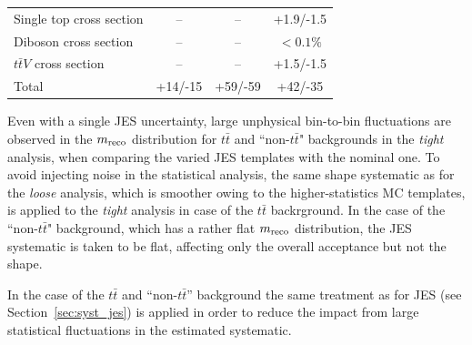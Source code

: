 \begin{table}[htb]
\begin{tabular}{l*{3}{c}}
Single top cross section & -- & -- & +1.9/-1.5\\  
Diboson cross section & -- & -- & $<0.1\%$\\  
$t\bar{t}V$ cross section & -- & -- & +1.5/-1.5\\  
\hline
Total & +14/-15 & +59/-59 & +42/-35\\
\hline\hline
\end{tabular}
\label{tab:SystSummary}
\end{table}





Even with a single JES uncertainty, large unphysical bin-to-bin fluctuations are observed
in the $m_{\rm reco}$ distribution for $t\bar{t}$ and ``non-$t\bar{t}$" backgrounds in the {\sl tight} analysis,
when comparing the varied JES templates with the nominal one. To avoid injecting
noise in the statistical analysis, the same shape systematic as for the {\sl loose} analysis,
which is smoother owing to the higher-statistics MC templates, is applied to the {\sl tight} 
analysis in case of the $t\bar{t}$ backrground. In the case of the ``non-$t\bar{t}$" background,
which has a rather flat  $m_{\rm reco}$ distribution, the JES systematic is taken to be
flat, affecting only the overall acceptance but not the shape.


In the case of the $t\bar{t}$ and ``non-$t\bar{t}$'' background the same treatment as for
JES (see Section~\ref{sec:syst_jes}) is applied in order to reduce the impact from
large statistical fluctuations in the estimated systematic.


